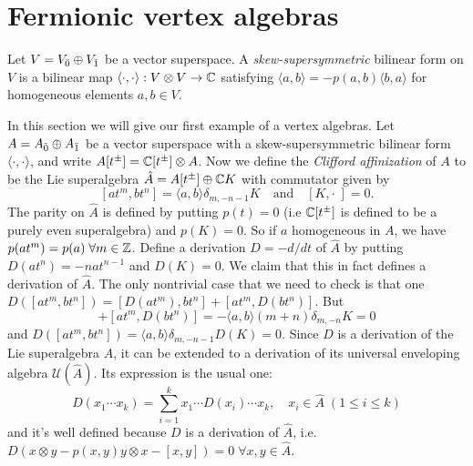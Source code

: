 \section{Fermionic vertex algebras}
\begin{dang}
\begin{definition}\cite{kac2013bombay}
    Let $V=V_{\Bar{0}}\oplus V_{\Bar{1}}$ be a vector superspace. A \textit{skew-supersymmetric} bilinear form on $V$ is a bilinear map $\langle\cdot,\cdot\rangle: V\otimes V\rightarrow\mathbb{C}$ satisfying $\langle a,b\rangle=-p(a,b)\langle b,a\rangle$ for homogeneous elements $a,b\in V$.
\end{definition}
\end{dang}
In this section we will give our first example of a vertex algebras. Let $A=A_{\Bar{0}}\oplus A_{\Bar{1}}$ be a vector superspace with a skew-supersymmetric bilinear form $\langle\cdot,\cdot\rangle$, and write $A[t^{\pm}]=\mathbb{C}[t^{\pm}]\otimes A$. Now we define the \textit{Clifford affinization} of $A$ to be the Lie superalgebra $ \hat{A}=A[t^{\pm}]\oplus\mathbb{C}K$ with commutator given by
\begin{equation}\label{Equation: commutator in the clifford afinization}
   [at^m,bt^n]=\langle a,b\rangle\delta_{m,-n-1}K\quad\text{and}\quad [K,\cdot\;]=0.
\end{equation}
The parity on $\hat{A}$ is defined by putting $p(t)=0$ (i.e $\mathbb{C}[t^\pm]$ is defined to be a purely even superalgebra) and $p(K)=0$. So if $a$ homogeneous in $A$, we have $p(at^m)=p(a)\;\forall m\in\mathbb{Z}$. Define a derivation $D=-d/dt$ of $\hat{A}$ by putting $D(at^n)=-nat^{n-1}$ and $D(K)=0$. We claim that this in fact defines a derivation of $\hat{A}$. The only nontrivial case that we need to check is that one $D([at^m,bt^n])=[D(at^m),bt^n]+[at^m,D(bt^n)]$. But
\begin{equation}
    [D(at^m),bt^n]+[at^m,D(bt^n)]=-\langle a,b\rangle(m+n)\delta_{m,-n}K=0
\end{equation}
and $D([at^m,bt^n])=\langle a,b\rangle\delta_{m,-n-1}D(K)=0$. Since $D$ is a derivation of the Lie superalgebra $\hat{A}$, it can be extended to a derivation of its universal enveloping algebra $\mathcal{U}(\hat{A})$. Its expression is the usual one:
\begin{equation}
    D(x_{1}\cdots x_{k})=\sum_{i=1}^k x_{1}\cdots D(x_{i})\cdots x_{k},\quad x_{i}\in\hat{A}\;(1\leq i\leq k)
\end{equation}
and it's well defined because $D$ is a derivation of $\hat{A}$, i.e. $D(x\otimes y-p(x,y)y\otimes x-[x,y])=0\;\forall x,y\in\hat{A}$. \par
